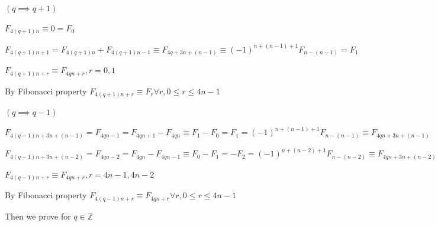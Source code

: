 \documentclass{article}
\begin{document}
\( (q \implies q + 1) \)

\( F_{4(q+1)n} \equiv 0 = F_0 \)

\( F_{4(q+1)n+1} = F_{4(q+1)n} + F_{4(q+1)n - 1} \equiv F_{4q+3n+(n-1)} \equiv (-1)^{n+(n-1)+1}F_{n-(n-1)} = F_1 \)

\( F_{4(q+1)n+r} \equiv F_{4qn+r}, r = 0, 1 \)

By Fibonacci property \( F_{4(q+1)n+r} \equiv F_r \forall r, 0 \leq r \leq 4n -1 \)

\( (q \implies q - 1) \)

\( F_{4(q-1)n + 3n + (n-1)} = F_{4qn - 1} = F_{4qn+1} - F_{4qn} \equiv F_1 - F_0 = F_1 = (-1)^{n+(n-1)+1}F_{n-(n-1)} \equiv F_{4qn + 3n + (n-1)} \)

\( F_{4(q-1)n + 3n + (n-2)} = F_{4qn - 2} = F_{4qn} - F_{4qn-1} \equiv F_0 - F_1 = -F_2 = (-1)^{n+(n-2)+1}F_{n-(n-2)} \equiv F_{4qn + 3n + (n-2)} \)

\( F_{4(q-1)n + r} \equiv F_{4qn + r}, r = 4n-1, 4n-2 \)

By Fibonacci property \( F_{4(q-1)n+r} \equiv F_{4qn + r} \forall r, 0 \leq r \leq 4n - 1 \)

Then we prove for \( q \in \mathbb{Z} \)
\end{document}
